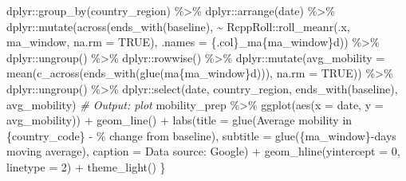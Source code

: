 \documentclass[
]{book}
\newenvironment{Shaded}{\begin{snugshade}}{\end{snugshade}}
\newcommand{\AttributeTok}[1]{\textcolor[rgb]{0.77,0.63,0.00}{#1}}
\newcommand{\CommentTok}[1]{\textcolor[rgb]{0.56,0.35,0.01}{\textit{#1}}}
\newcommand{\ConstantTok}[1]{\textcolor[rgb]{0.00,0.00,0.00}{#1}}
\newcommand{\DecValTok}[1]{\textcolor[rgb]{0.00,0.00,0.81}{#1}}
\newcommand{\FunctionTok}[1]{\textcolor[rgb]{0.00,0.00,0.00}{#1}}
\newcommand{\NormalTok}[1]{#1}
\newcommand{\SpecialCharTok}[1]{\textcolor[rgb]{0.00,0.00,0.00}{#1}}
\newcommand{\StringTok}[1]{\textcolor[rgb]{0.31,0.60,0.02}{#1}}
\begin{document}
\begin{Shaded}
\begin{Highlighting}[]
\NormalTok{    dplyr}\SpecialCharTok{::}\FunctionTok{group\_by}\NormalTok{(country\_region) }\SpecialCharTok{\%\textgreater{}\%}
\NormalTok{    dplyr}\SpecialCharTok{::}\FunctionTok{arrange}\NormalTok{(date) }\SpecialCharTok{\%\textgreater{}\%} 
\NormalTok{    dplyr}\SpecialCharTok{::}\FunctionTok{mutate}\NormalTok{(}\FunctionTok{across}\NormalTok{(}\FunctionTok{ends\_with}\NormalTok{(}\StringTok{\textquotesingle{}baseline\textquotesingle{}}\NormalTok{), }\SpecialCharTok{\textasciitilde{}}\NormalTok{ RcppRoll}\SpecialCharTok{::}\FunctionTok{roll\_meanr}\NormalTok{(.x, ma\_window, }\AttributeTok{na.rm =} \ConstantTok{TRUE}\NormalTok{), }\AttributeTok{.names =} \StringTok{\textquotesingle{}\{.col\}\_ma\{ma\_window\}d\textquotesingle{}}\NormalTok{)) }\SpecialCharTok{\%\textgreater{}\%}
\NormalTok{    dplyr}\SpecialCharTok{::}\FunctionTok{ungroup}\NormalTok{() }\SpecialCharTok{\%\textgreater{}\%} 
\NormalTok{    dplyr}\SpecialCharTok{::}\FunctionTok{rowwise}\NormalTok{() }\SpecialCharTok{\%\textgreater{}\%} 
\NormalTok{    dplyr}\SpecialCharTok{::}\FunctionTok{mutate}\NormalTok{(}\AttributeTok{avg\_mobility =} \FunctionTok{mean}\NormalTok{(}\FunctionTok{c\_across}\NormalTok{(}\FunctionTok{ends\_with}\NormalTok{(}\FunctionTok{glue}\NormalTok{(}\StringTok{\textquotesingle{}ma\{ma\_window\}d\textquotesingle{}}\NormalTok{))), }\AttributeTok{na.rm =} \ConstantTok{TRUE}\NormalTok{)) }\SpecialCharTok{\%\textgreater{}\%}
\NormalTok{    dplyr}\SpecialCharTok{::}\FunctionTok{ungroup}\NormalTok{() }\SpecialCharTok{\%\textgreater{}\%} 
\NormalTok{    dplyr}\SpecialCharTok{::}\FunctionTok{select}\NormalTok{(date, country\_region, }\FunctionTok{ends\_with}\NormalTok{(}\StringTok{\textquotesingle{}baseline\textquotesingle{}}\NormalTok{), avg\_mobility) }
  \CommentTok{\# Output: plot}
\NormalTok{  mobility\_prep }\SpecialCharTok{\%\textgreater{}\%} 
    \FunctionTok{ggplot}\NormalTok{(}\FunctionTok{aes}\NormalTok{(}\AttributeTok{x =}\NormalTok{ date, }\AttributeTok{y =}\NormalTok{ avg\_mobility)) }\SpecialCharTok{+}
    \FunctionTok{geom\_line}\NormalTok{() }\SpecialCharTok{+}
    \FunctionTok{labs}\NormalTok{(}\AttributeTok{title =} \FunctionTok{glue}\NormalTok{(}\StringTok{\textquotesingle{}Average mobility in \{country\_code\} {-} \% change from baseline\textquotesingle{}}\NormalTok{),}
         \AttributeTok{subtitle =} \FunctionTok{glue}\NormalTok{(}\StringTok{\textquotesingle{}\{ma\_window\}{-}days moving average\textquotesingle{}}\NormalTok{),}
         \AttributeTok{caption =} \StringTok{\textquotesingle{}Data source: Google\textquotesingle{}}\NormalTok{) }\SpecialCharTok{+}
    \FunctionTok{geom\_hline}\NormalTok{(}\AttributeTok{yintercept =} \DecValTok{0}\NormalTok{, }\AttributeTok{linetype =} \DecValTok{2}\NormalTok{) }\SpecialCharTok{+}
    \FunctionTok{theme\_light}\NormalTok{()}
\NormalTok{\}}
\end{Highlighting}
\end{Shaded}
\end{document}
